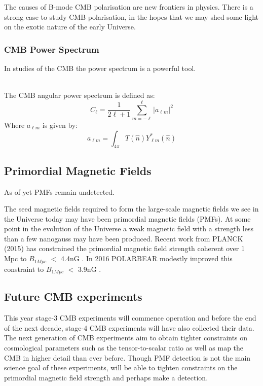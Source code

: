 The causes of B-mode CMB polarisation are new frontiers in physics. There is a strong case to study CMB polarisation, in the hopes that we may shed some light on the exotic nature of the early Universe.

\subsubsection*{CMB Power Spectrum}

In studies of the CMB the power spectrum is a powerful tool. 

\\
The CMB angular power spectrum is defined as:
\begin{equation}
C_{\ell} = \frac{1}{2\ell + 1} \sum_{m = -\ell}^{\ell} \vert a_{\ell m} \vert ^2
\end{equation}
Where $a_{\ell m}$ is given by:
\begin{equation}
a_{\ell m} = \int_{4 \pi} T(\hat{n}) Y_{\ell m}^{*}(\hat{n})
\end{equation}

\subsection{Primordial Magnetic Fields}

As of yet PMFs remain undetected. 

The seed magnetic fields required to form the large-scale magnetic fields we see in the Universe today may have been primordial magnetic fields (PMFs). At some point in the evolution of the Universe a weak magnetic field with a strength less than a few nanogauss may have been produced. Recent work from PLANCK (2015) has constrained the primordial magnetic field strength coherent over 1 Mpc to $B_{1Mpc}$ $<$ 4.4nG \cite{Ade:2015cva}. In 2016 POLARBEAR modestly improved this constraint to $B_{1Mpc}$ $<$ 3.9nG \cite{Ade:2015cao}.

\subsection{Future CMB experiments}
This year stage-3 CMB experiments will commence operation and before the end of the next decade, stage-4 CMB experiments will have also collected their data. The next generation of CMB experiments aim to obtain tighter constraints on cosmological parameters such as the tensor-to-scalar ratio as well as map the CMB in higher detail than ever before. Though PMF detection is not the main science goal of these experiments, will be able to tighten constraints on the primordial magnetic field strength and perhaps make a detection.

